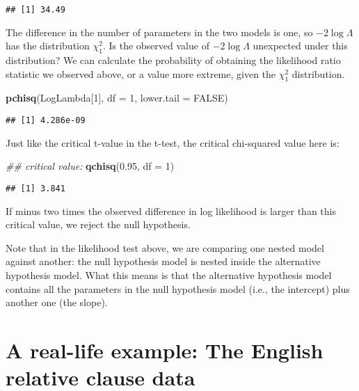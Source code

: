 \documentclass[12pt,]{krantz}
\newenvironment{Shaded}{\begin{snugshade}}{\end{snugshade}}
\newcommand{\CommentTok}[1]{\textcolor[rgb]{0.56,0.35,0.01}{\textit{#1}}}
\newcommand{\DataTypeTok}[1]{\textcolor[rgb]{0.13,0.29,0.53}{#1}}
\newcommand{\DecValTok}[1]{\textcolor[rgb]{0.00,0.00,0.81}{#1}}
\newcommand{\FloatTok}[1]{\textcolor[rgb]{0.00,0.00,0.81}{#1}}
\newcommand{\KeywordTok}[1]{\textcolor[rgb]{0.13,0.29,0.53}{\textbf{#1}}}
\newcommand{\NormalTok}[1]{#1}
\newcommand{\OtherTok}[1]{\textcolor[rgb]{0.56,0.35,0.01}{#1}}
\begin{document}
\begin{verbatim}
## [1] 34.49
\end{verbatim}

The difference in the number of parameters in the two models is one, so \(-2\log\Lambda\) has the distribution \(\chi_1^2\). Is the observed value of \(-2\log\Lambda\) unexpected under this distribution? We can calculate the probability of obtaining the likelihood ratio statistic we observed above, or a value more extreme, given the \(\chi_1^2\) distribution.

\begin{Shaded}
\begin{Highlighting}[]
\KeywordTok{pchisq}\NormalTok{(LogLambda[}\DecValTok{1}\NormalTok{], }\DataTypeTok{df =} \DecValTok{1}\NormalTok{, }\DataTypeTok{lower.tail =} \OtherTok{FALSE}\NormalTok{)}
\end{Highlighting}
\end{Shaded}

\begin{verbatim}
## [1] 4.286e-09
\end{verbatim}

Just like the critical t-value in the t-test, the critical chi-squared value here is:

\begin{Shaded}
\begin{Highlighting}[]
\CommentTok{## critical value:}
\KeywordTok{qchisq}\NormalTok{(}\FloatTok{0.95}\NormalTok{, }\DataTypeTok{df =} \DecValTok{1}\NormalTok{)}
\end{Highlighting}
\end{Shaded}

\begin{verbatim}
## [1] 3.841
\end{verbatim}

If minus two times the observed difference in log likelihood is larger than this critical value, we reject the null hypothesis.

Note that in the likelihood test above, we are comparing one nested model against another: the null hypothesis model is nested inside the alternative hypothesis model. What this means is that the alternative hypothesis model contains all the parameters in the null hypothesis model (i.e., the intercept) plus another one (the slope).

\hypertarget{a-real-life-example-the-english-relative-clause-data}{%
\section{A real-life example: The English relative clause data}\label{a-real-life-example-the-english-relative-clause-data}}
\end{document}
